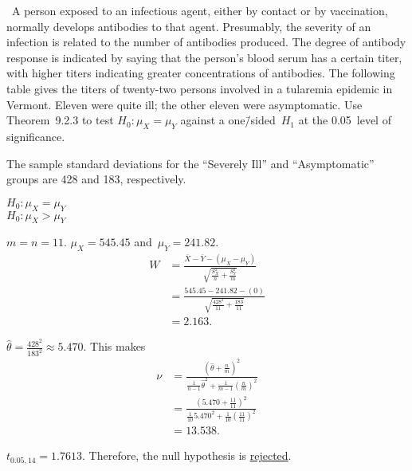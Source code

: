 \begin{problem}
  ~A person exposed to an infectious agent, either by contact or by vaccination, normally develops antibodies to that agent. Presumably, the severity of an infection is related to the number of antibodies produced. The degree of antibody response is indicated by saying that the person’s blood serum has a certain titer, with higher titers indicating greater concentrations of antibodies. The following table gives the titers of twenty-two persons involved in a tularemia epidemic in Vermont. Eleven were quite ill; the other eleven were asymptomatic. Use Theorem~9.2.3 to test ${H_0: \mu_X = \mu_Y}$ against a one\=/sided~${H_1}$ at the 0.05~level of significance.

  The sample standard deviations for the “Severely Ill” and “Asymptomatic” groups are 428 and 183, respectively.
\end{problem}

\noindent
${H_0: \mu_{X} = \mu_{Y}}$ \\
${H_0: \mu_{X} > \mu_{Y}}$

\noindent
${m = n = 11}$. ${\mu_{X} = 545.45}$ and~${\mu_{Y} = 241.82}$.
\begin{align}
  W &= \frac{\bar{X} - \bar{Y} - (\mu_{X} - \mu_{Y})}{\sqrt{\frac{S_{X}^{2}}{n} + \frac{S_{Y}^{2}}{m}}} \\
    &= \frac{545.45 - 241.82 - (0)}{\sqrt{\frac{428^2}{11}+\frac{183}{11}}} \\
    &= 2.163\text{.}
\end{align}

\noindent
${\hat{\theta} = \frac{428^2}{183^2} \approx 5.470}$.  This makes
\begin{align}
  \nu &= \frac{(\hat{\theta} + \frac{n}{m})^2}{\frac{1}{n-1}\hat{\theta}^2 + \frac{1}{m-1}\left(\frac{n}{m}\right)^2} \\
      &= \frac{\left(5.470 + \frac{11}{11}\right)^2}{\frac{1}{10} 5.470^2 + \frac{1}{10}\left(\frac{11}{11}\right)^2} \\
      &= 13.538 \text{.}
\end{align}

\noindent
${t_{0.05,14} = 1.7613}$.  Therefore, the null hypothesis is \underline{rejected}.
